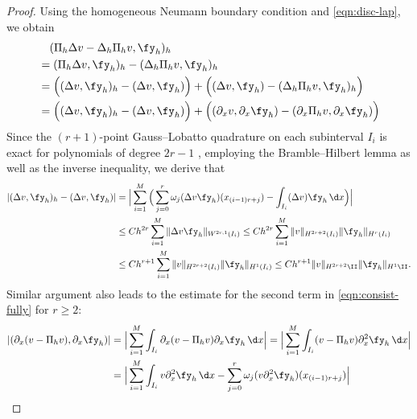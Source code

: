 \begin{proof}
Using the homogeneous Neumann boundary condition
and  \eqref{eqn:disc-lap}, we obtain
\begin{equation}\label{eqn:consist-fully}
\begin{aligned}
  &\quad(\Pi_h \Delta v - \Delta_h \Pi_h v, \fy_h )_h \\
  &= (\Pi_h \Delta v , \fy_h )_h -  (\Delta_h \Pi_h v, \fy_h )_h\\
  &= \Big(( \Delta v , \fy_h )_h - ( \Delta v , \fy_h )\Big) +  \Big(( \Delta v , \fy_h ) -  (\Delta_h \Pi_h v, \fy_h )_h\Big)\\
    &= \Big(( \Delta v , \fy_h )_h - ( \Delta v , \fy_h )\Big) +  \Big(( \partial_x v , \partial_x \fy_h ) -  (\partial_x \Pi_h v, \partial_x \fy_h )\Big)\\
\end{aligned}
\end{equation}
Since the $(r + 1)$-point Gauss--Lobatto quadrature on each subinterval $I_i$ is exact for polynomials of degree
$2r - 1$ \cite[pp. 425]{Quarteroni:2000}, employing the Bramble--Hilbert lemma
as well as the inverse inequality, we derive that
\begin{align*}
|( \Delta v , \fy_h )_h - ( \Delta v , \fy_h ) | &= \Big|\sum_{i=1}^M \Big(\sum_{j=0}^{r} \omega_j  (\Delta v   \fy_h)(x_{(i-1)r+j}) - \int_{I_i} (\Delta v ) \fy_h \,\d x\Big) \Big|\\
&\le C h^{2r} \sum_{i=1}^M \| \Delta v   \fy_h  \|_{W^{2r,1}(I_i)} \le  C h^{2r} \sum_{i=1}^M \|   v  \|_{H^{2r+2}(I_i)}  \| \fy_h  \|_{H^{r}(I_i)}\\
&\le Ch^{r+1} \sum_{i=1}^M \|   v  \|_{H^{2r+2}(I_i)}  \| \fy_h  \|_{H^{1}(I_i)} \le Ch^{r+1}  \|   v  \|_{H^{2r+2}\II}  \| \fy_h  \|_{H^{1}\II}.
\end{align*}
Similar argument also leads to the estimate for the second term in \eqref{eqn:consist-fully} for $r\ge2$:
\begin{align*}
 |( \partial_x (v- \Pi_h v), \partial_x \fy_h )|
 &= \Big|\sum_{i=1}^M \int_{I_i}  \partial_x (v- \Pi_h v) \partial_x \fy_h \,\d x\Big|
 =\Big|\sum_{i=1}^M \int_{I_i}    (v- \Pi_h v) \partial_x^2 \fy_h \,\d x\Big|\\
& =\Big|\sum_{i=1}^M \int_{I_i}    v  \partial_x^2 \fy_h \,\d x - \sum_{j=0}^{r} \omega_j  (  v  \partial_x^2 \fy_h)(x_{(i-1)r+j}) \Big|\\

\end{align*}
\end{proof}
